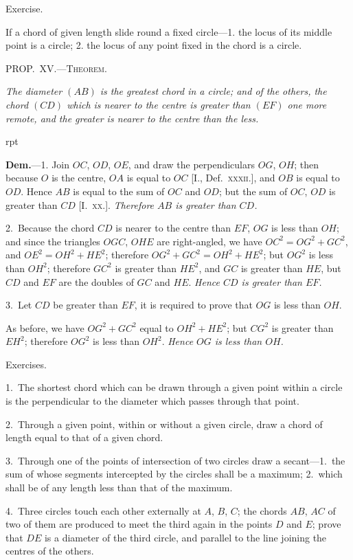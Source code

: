 \documentclass[oneside]{book}
\newcounter{wrapwidth}
\newcommand\mypropl[2]{
\bigskip\Needspace*{4\baselineskip}\begin{center}\textsc{#1}\end{center}
\hspace{\parindent}\emph{#2}\par\medskip
}
\newcommand\exhead[1]{
\Needspace*{5\baselineskip}\begin{center}
\textsf{#1}
\end{center}
}
\newcommand\imgflow[3]{
\setcounter{wrapwidth}{#1}

\begin{wrapfigure}[#2]{r}{\value{wrapwidth}pt}
\begin{center}
\vspace{-0.3in}

\end{center}
\end{wrapfigure}
}
\begin{document}
\exhead{Exercise.}

\begin{footnotesize}
If a chord of given length slide round a fixed circle---1. the
locus of its middle point is a circle; 2. the locus of any point
fixed in the chord is a circle.
\par\end{footnotesize}


\mypropl{PROP\@.~XV\@.---Theorem.}{The diameter $(AB)$ is the greatest chord in a circle;
and of the others, the chord $(CD)$ which is nearer to
the centre is greater than $(EF)$ one more remote, and
the greater is nearer to the centre than the less.}


\imgflow{120}{9}{f120}

\textbf{Dem.}---1. Join $OC$, $OD$, $OE$, and draw the perpendiculars
$OG$, $OH$; then because
$O$ is the centre, $OA$ is equal to
$OC$ [I., Def.~\textsc{xxxii.}]\label{Idefxxii}, and $OB$ is
equal to $OD$. Hence $AB$ is equal
to the sum of $OC$ and $OD$; but
the sum of $OC$, $OD$ is greater
than $CD$ [I.~\textsc{xx.}]. \emph{Therefore $AB$
is greater than $CD$.}

2.~Because the chord $CD$ is nearer to the centre
than $EF$, $OG$ is less than $OH$; and since the triangles
$OGC$, $OHE$ are right-angled, we have $OC^{2} = OG^{2} + GC^{2}$,
and $OE^{2} = OH^{2} + HE^{2}$; therefore $OG^{2} + GC^{2} = OH^{2} + HE^{2}$;
but $OG^{2}$ is less than $OH^{2}$; therefore $GC^{2}$ is greater
than $HE^{2}$, and $GC$ is greater than $HE$, but $CD$ and $EF$
are the doubles of $GC$ and $HE$. \emph{Hence $CD$ is greater
than $EF$.}

3.~Let $CD$ be greater than $EF$, it is required to
prove that $OG$ is less than $OH$.

As before, we have $OG^{2} + GC^{2}$ equal to $OH^{2} + HE^{2}$;
but $CG^{2}$ is greater than $EH^{2}$; therefore $OG^{2}$ is less
than $OH^{2}$. \emph{Hence $OG$ is less than $OH$.}

\exhead{Exercises.}

\begin{footnotesize}
1.~The shortest chord which can be drawn through a given
point within a circle is the perpendicular to the diameter which
passes through that point.

2.~Through a given point, within or without a given circle,
draw a chord of length equal to that of a given chord.


3.~Through one of the points of intersection of two circles
draw a secant---1.\ the sum of whose segments intercepted by the
circles shall be a maximum; 2.\ which shall be of any length
less than that of the maximum.

4.~Three circles touch each other externally at $A$, $B$, $C$; the
chords $AB$, $AC$ of two of them are produced to meet the third
again in the points $D$ and $E$; prove that $DE$ is a diameter of the
third circle, and parallel to the line joining the centres of the
others.
\par\end{footnotesize}
\end{document}
